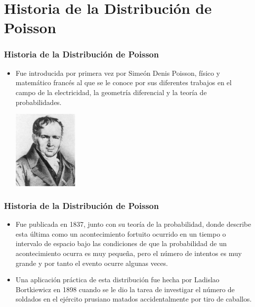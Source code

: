 \documentclass{beamer}
\begin{document}
\section{Historia de la Distribución de Poisson}
\begin{frame}
\frametitle{Historia de la Distribución de Poisson}

\begin{itemize}
\item Fue introducida por primera vez por Simeón Denis Poisson, físico y matemático francés al que se le conoce por sus diferentes trabajos en el campo de la electricidad, la geometría diferencial y la teoría de probabilidades.\pause

\centerline{\includegraphics[width=0.25\textwidth]{Poisson.eps}}
\end{itemize}
\end{frame}
\begin{frame}
\frametitle{Historia de la Distribución de Poisson}
\begin{itemize}
\item Fue publicada en 1837, junto con su teoría de la probabilidad, donde describe esta última como un acontecimiento fortuito ocurrido en un tiempo o intervalo de espacio bajo las condiciones de que la probabilidad de un acontecimiento ocurra es muy pequeña, pero el número de intentos es muy grande y por tanto el evento ocurre algunas veces.\pause
\item Una aplicación práctica de esta distribución fue hecha por Ladislao Bortkiewicz en 1898 cuando se le dio la tarea de investigar el número de soldados en el ejército prusiano matados accidentalmente por tiro de caballos.
\end{itemize}
\end{frame}

\end{document}
